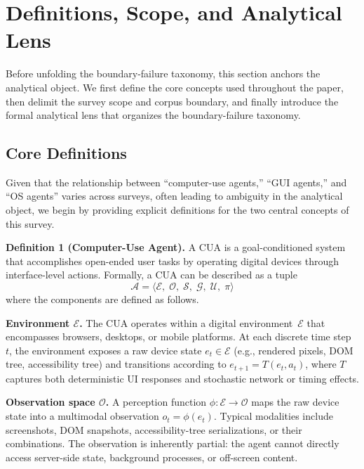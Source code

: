 \FloatBarrier

\section{Definitions, Scope, and Analytical Lens}

Before unfolding the boundary-failure taxonomy, this section anchors the analytical object. We first define the core concepts used throughout the paper, then delimit the survey scope and corpus boundary, and finally introduce the formal analytical lens that organizes the boundary-failure taxonomy.

\subsection{Core Definitions}
\label{sec:core-definitions}

Given that the relationship between ``computer-use agents,'' ``GUI agents,'' and ``OS agents'' varies across surveys, often leading to ambiguity in the analytical object, we begin by providing explicit definitions for the two central concepts of this survey.


\smallskip
\noindent\textbf{Definition 1 (Computer-Use Agent).}
A CUA is a goal-conditioned system that accomplishes open-ended user tasks by operating digital devices through interface-level actions. Formally, a CUA can be described as a tuple
\[
  \mathcal{A} = \langle \mathcal{E},\; \mathcal{O},\; \mathcal{S},\; \mathcal{G},\; \mathcal{U},\; \pi \rangle
\]
where the components are defined as follows.

\noindent\textbf{Environment $\mathcal{E}$.}
The CUA operates within a digital environment~$\mathcal{E}$ that encompasses browsers, desktops, or mobile platforms. At each discrete time step~$t$, the environment exposes a raw device state $e_t \in \mathcal{E}$ (e.g., rendered pixels, DOM tree, accessibility tree) and transitions according to $e_{t+1} = T(e_t, a_t)$, where $T$ captures both deterministic UI responses and stochastic network or timing effects.





\noindent\textbf{Observation space $\mathcal{O}$.}
A perception function $\phi\colon \mathcal{E} \to \mathcal{O}$ maps the raw device state into a multimodal observation $o_t = \phi(e_t)$. Typical modalities include screenshots, DOM snapshots, accessibility-tree serializations, or their combinations. The observation is inherently partial: the agent cannot directly access server-side state, background processes, or off-screen content.




